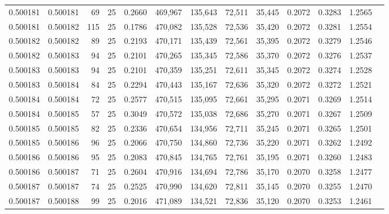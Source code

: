 \begin{tabular}{rrrrrrrrrrrrr}
0.500181 & 0.500181 &  69 &  25 &                                     0.2660 & 469,967 & 135,643 &  72,511 &  35,445 & 0.2072 & 0.3283 & 1.2565 \\
0.500181 & 0.500182 & 115 &  25 &                                     0.1786 & 470,082 & 135,528 &  72,536 &  35,420 & 0.2072 & 0.3281 & 1.2554 \\
0.500182 & 0.500182 &  89 &  25 &                                     0.2193 & 470,171 & 135,439 &  72,561 &  35,395 & 0.2072 & 0.3279 & 1.2546 \\
0.500182 & 0.500183 &  94 &  25 &                                     0.2101 & 470,265 & 135,345 &  72,586 &  35,370 & 0.2072 & 0.3276 & 1.2537 \\
0.500183 & 0.500183 &  94 &  25 &                                     0.2101 & 470,359 & 135,251 &  72,611 &  35,345 & 0.2072 & 0.3274 & 1.2528 \\
0.500183 & 0.500184 &  84 &  25 &                                     0.2294 & 470,443 & 135,167 &  72,636 &  35,320 & 0.2072 & 0.3272 & 1.2521 \\
0.500184 & 0.500184 &  72 &  25 &                                     0.2577 & 470,515 & 135,095 &  72,661 &  35,295 & 0.2071 & 0.3269 & 1.2514 \\
0.500184 & 0.500185 &  57 &  25 &                                     0.3049 & 470,572 & 135,038 &  72,686 &  35,270 & 0.2071 & 0.3267 & 1.2509 \\
0.500185 & 0.500185 &  82 &  25 &                                     0.2336 & 470,654 & 134,956 &  72,711 &  35,245 & 0.2071 & 0.3265 & 1.2501 \\
0.500185 & 0.500186 &  96 &  25 &                                     0.2066 & 470,750 & 134,860 &  72,736 &  35,220 & 0.2071 & 0.3262 & 1.2492 \\
0.500186 & 0.500186 &  95 &  25 &                                     0.2083 & 470,845 & 134,765 &  72,761 &  35,195 & 0.2071 & 0.3260 & 1.2483 \\
0.500186 & 0.500187 &  71 &  25 &                                     0.2604 & 470,916 & 134,694 &  72,786 &  35,170 & 0.2070 & 0.3258 & 1.2477 \\
0.500187 & 0.500187 &  74 &  25 &                                     0.2525 & 470,990 & 134,620 &  72,811 &  35,145 & 0.2070 & 0.3255 & 1.2470 \\
0.500187 & 0.500188 &  99 &  25 &                                     0.2016 & 471,089 & 134,521 &  72,836 &  35,120 & 0.2070 & 0.3253 & 1.2461 \\

\end{tabular}

